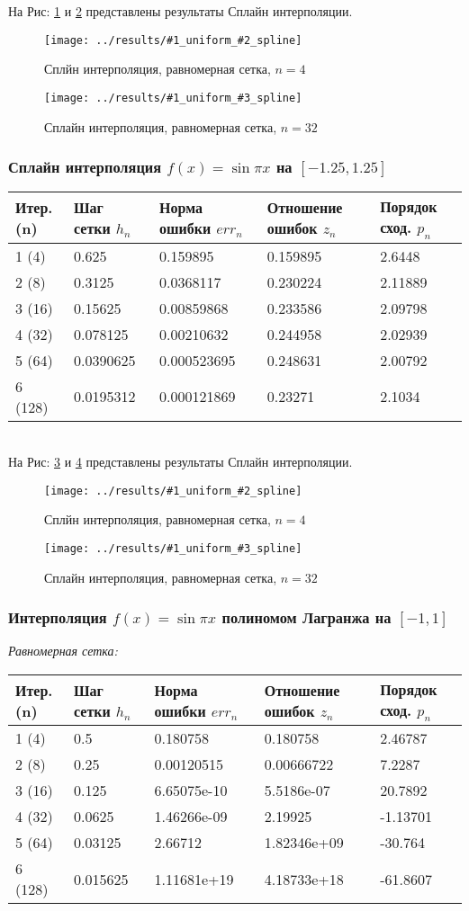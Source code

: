 \documentclass[12pt]{article}
\newcommand{\spline}[3] {
	На Рис:  \ref{fig:#1uniform#2spline} и \ref{fig:#1uniform#3spline} представлены результаты Сплайн интерполяции.
	
	\begin{figure}[H]
		\centering
		\texttt{[image: ../results/\#1\_uniform\_\#2\_spline]}
		\caption{Сплйн интерполяция, равномерная сетка, $n = #2$}
		\label{fig:#1uniform#2spline}
	\end{figure}
	\begin{figure}[H]
		\centering
		\texttt{[image: ../results/\#1\_uniform\_\#3\_spline]}
		\caption{Сплайн интерполяция, равномерная сетка, $n = #3$}
		\label{fig:#1uniform#3spline}
	\end{figure}
}
\begin{document}
\spline{sin1}{4}{32}

\subsubsection{Сплайн интерполяция $f(x) = \sin{\pi x}$ на $[-1.25, 1.25]$}
\begin{tabular}{|l|l|l|l|l|}
	\hline 
	Итер.(n) & Шаг сетки $h_n$ & Норма ошибки $err_n$ &  Отношение ошибок $z_n$ & Порядок сход. $p_n$ \\ \hline
	1 (4)  & 0.625 & 0.159895 & 0.159895 & 2.6448 \\ \hline
	2 (8)  & 0.3125 & 0.0368117 & 0.230224 & 2.11889 \\ \hline
	3 (16)  & 0.15625 & 0.00859868 & 0.233586 & 2.09798 \\ \hline
	4 (32)  & 0.078125 & 0.00210632 & 0.244958 & 2.02939 \\ \hline
	5 (64)  & 0.0390625 & 0.000523695 & 0.248631 & 2.00792 \\ \hline
	6 (128)  & 0.0195312 & 0.000121869 & 0.23271 & 2.1034 \\ \hline
\end{tabular}\\

\spline{sin125}{4}{32}

\subsubsection{Интерполяция  $f(x) = \sin{\pi x}$ полиномом Лагранжа на $[-1, 1]$}
\textit{Равномерная сетка:}\\


\begin{tabular}{|l|l|l|l|l|}
	\hline 
	Итер.(n) & Шаг сетки $h_n$ & Норма ошибки $err_n$ &  Отношение ошибок $z_n$ & Порядок сход. $p_n$ \\ \hline
	1 (4)  & 0.5 & 0.180758 & 0.180758 & 2.46787 \\ \hline
	2 (8)  & 0.25 & 0.00120515 & 0.00666722 & 7.2287 \\ \hline
	3 (16)  & 0.125 & 6.65075e-10 & 5.5186e-07 & 20.7892 \\ \hline
	4 (32)  & 0.0625 & 1.46266e-09 & 2.19925 & -1.13701 \\ \hline
	5 (64)  & 0.03125 & 2.66712 & 1.82346e+09 & -30.764 \\ \hline
	6 (128)  & 0.015625 & 1.11681e+19 & 4.18733e+18 & -61.8607 \\ \hline
\end{tabular}\\
\end{document}
